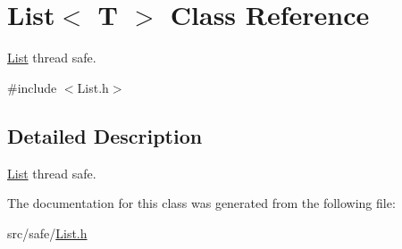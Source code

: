 \hypertarget{class_list_3_01_t_01_4}{\section{List$<$ T $>$ Class Reference}
\label{class_list_3_01_t_01_4}
}


\hyperlink{class_list}{List} thread safe.  




{\ttfamily \#include $<$List.\-h$>$}



\subsection{Detailed Description}
\hyperlink{class_list}{List} thread safe. 

The documentation for this class was generated from the following file\-:\begin{DoxyCompactItemize}
\item 
src/safe/\hyperlink{_list_8h}{List.\-h}\end{DoxyCompactItemize}
